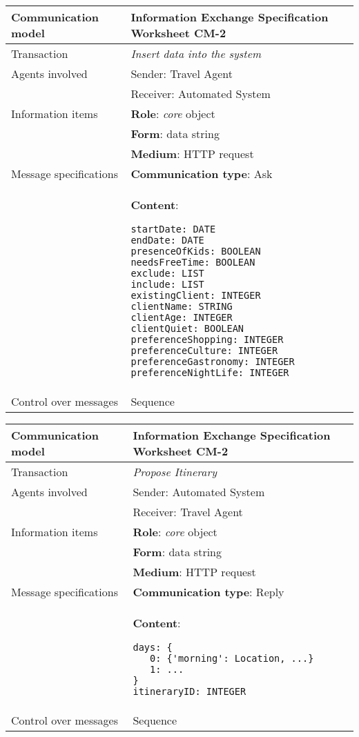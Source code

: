 \begin{tabular}%
      {|p{4cm}%
        |p{8cm}|}
\hline
{\bf Communication model} &
   {\bf Information Exchange Specification Worksheet CM-2} \\
\hline
\hline
\sc Transaction &
   {\em
   Insert data into the system
   } \\
\hline
\sc Agents involved &
   {\rm Sender: Travel Agent} \\
   & {\rm Receiver: Automated System}\\
\hline
\sc Information items 
&  {\bf Role}: {\em core} object
   \\
&  {\bf Form}: data string
   \\
&  {\bf Medium}: HTTP request
   \\
\hline
\sc Message specifications 
&  {\bf Communication type}: Ask
   \\
&  {\bf Content}: 
\begin{lstlisting}[breaklines=true,mathescape=true]
startDate: DATE 
endDate: DATE 
presenceOfKids: BOOLEAN
needsFreeTime: BOOLEAN
exclude: LIST
include: LIST
existingClient: INTEGER
clientName: STRING 
clientAge: INTEGER
clientQuiet: BOOLEAN
preferenceShopping: INTEGER
preferenceCulture: INTEGER
preferenceGastronomy: INTEGER
preferenceNightLife: INTEGER
\end{lstlisting}
   \\
\hline
\sc Control over messages &
   Sequence
   \\
\hline
\end{tabular}
\newline
\vspace{0.8 cm}
\newline
\noindent
\begin{tabular}%
      {|p{4cm}%
        |p{8cm}|}
\hline
{\bf Communication model} &
   {\bf Information Exchange Specification Worksheet CM-2} \\
\hline
\hline
\sc Transaction &
   {\em
   Propose Itinerary
   } \\
\hline
\sc Agents involved &
   {\rm Sender: Automated System} \\
   & {\rm Receiver: Travel Agent}\\
\hline
\sc Information items 
&  {\bf Role}: {\em core} object
   \\
&  {\bf Form}: data string
   \\
&  {\bf Medium}: HTTP request
   \\
\hline
\sc Message specifications 
&  {\bf Communication type}: Reply
   \\
&  {\bf Content}: 
\begin{lstlisting}[breaklines=true,mathescape=true]
days: {
   0: {'morning': Location, ...}
   1: ...
}
itineraryID: INTEGER
\end{lstlisting}
   \\
\hline
\sc Control over messages &
   Sequence
   \\
\hline
\end{tabular}
